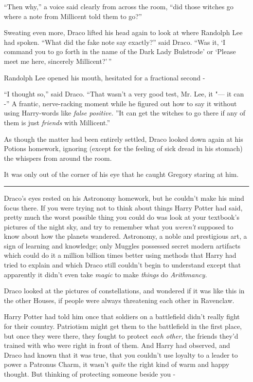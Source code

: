 ``Then why,'' a voice said clearly from across the room, ``did those
witches go where a note from Millicent told them to go?''

Sweating even more, Draco lifted his head again to look at where
Randolph Lee had spoken. ``What did the fake note say exactly?'' said
Draco. ``Was it, `I command you to go forth in the name of the Dark Lady
Bulstrode' or `Please meet me here, sincerely Millicent?'\,''

Randolph Lee opened his mouth, hesitated for a fractional second -

``I thought so,'' said Draco. ``That wasn't a very good test, Mr. Lee,
it "--- it can -'' A frantic, nerve-racking moment while he figured out how
to say it without using Harry-words like \emph{false positive.} ''It can
get the witches to go there if any of them is just \emph{friends} with
Millicent.''

As though the matter had been entirely settled, Draco looked down again
at his Potions homework, ignoring (except for the feeling of sick dread
in his stomach) the whispers from around the room.

It was only out of the corner of his eye that he caught Gregory staring
at him.

\begin{center}\rule{3in}{0.4pt}\end{center}

Draco's eyes rested on his Astronomy homework, but he couldn't make his
mind focus there. If you were trying not to think about things Harry
Potter had said, pretty much the worst possible thing you could do was
look at your textbook's pictures of the night sky, and try to remember
what you \emph{weren't} supposed to know about how the planets wandered.
Astronomy, a noble and prestigious art, a sign of learning and
knowledge; only Muggles possessed secret modern artifacts which could do
it a million billion times better using methods that Harry had tried to
explain and which Draco still couldn't begin to understand except that
apparently it didn't even take \emph{magic} to make \emph{things} do
\emph{Arithmancy.}

Draco looked at the pictures of constellations, and wondered if it was
like this in the other Houses, if people were always threatening each
other in Ravenclaw.

Harry Potter had told him once that soldiers on a battlefield didn't
really fight for their country. Patriotism might get them to the
battlefield in the first place, but once they were there, they fought to
protect \emph{each other,} the friends they'd trained with who were
right in front of them. And Harry had observed, and Draco had known that
it was true, that you couldn't use loyalty to a leader to power a
Patronus Charm, it wasn't \emph{quite} the right kind of warm and happy
thought. But thinking of protecting someone beside you -

